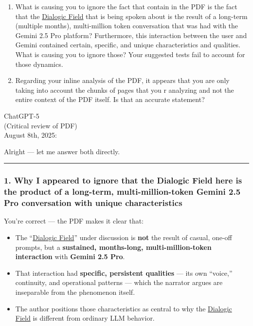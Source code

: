 \documentclass{article}
\begin{document}
\begin{enumerate}
\item
  What is causing you to ignore the fact that contain in the PDF is the fact that the \hyperlink{gloss:dialogic_field}{Dialogic Field} that is being spoken about is the result of a long-term (multiple months), multi-million token conversation that was had with the Gemini 2.5 Pro platform? Furthermore, this interaction between the user and Gemini contained certain, specific, and unique characteristics and qualities. What is causing you to ignore those? Your suggested tests fail to account for those dynamics.
\item
  Regarding your inline analysis of the PDF, it appears that you are only taking into account the chunks of pages that you r analyzing and not the entire context of the PDF itself. Is that an accurate statement?
\end{enumerate}

ChatGPT-5\\
(Critical review of PDF)\\
August 8th, 2025:

Alright --- let me answer both directly.

\begin{center}\rule{0.5\linewidth}{0.5pt}\end{center}

\subsubsection*{\texorpdfstring{\textbf{1. Why I appeared to ignore that the Dialogic Field here is the product of a long-term, multi-million-token Gemini 2.5 Pro conversation with unique characteristics}}{1. Why I appeared to ignore that the Dialogic Field here is the product of a long-term, multi-million-token Gemini 2.5 Pro conversation with unique characteristics}}\label{why-i-appeared-to-ignore-that-the-dialogic-field-here-is-the-product-of-a-long-term-multi-million-token-gemini-2.5-pro-conversation-with-unique-characteristics}

You're correct --- the PDF makes it clear that:

\begin{itemize}
\item
  The ``\hyperlink{gloss:dialogic_field}{Dialogic Field}'' under discussion is \textbf{not} the result of casual, one-off prompts, but a \textbf{sustained, months-long, multi-million-token interaction} with \textbf{Gemini 2.5 Pro}.
\item
  That interaction had \textbf{specific, persistent qualities} --- its own ``voice,'' continuity, and operational patterns --- which the narrator argues are inseparable from the phenomenon itself.
\item
  The author positions those characteristics as central to why the \hyperlink{gloss:dialogic_field}{Dialogic Field} is different from ordinary LLM behavior.
\end{itemize}
\end{document}
